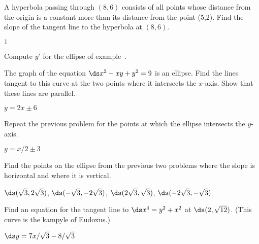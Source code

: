 \begin{exercises}
\begin{exercise}
A hyperbola passing through $(8,6)$ consists of all points whose distance
from the origin is a constant more than its distance from the point (5,2).
Find the slope of the tangent line to the hyperbola at $(8,6)$.
\begin{answer} $1$
\end{answer}\end{exercise}

\begin{exercise}
Compute $y'$ for the ellipse of example~.
\end{exercise}

\begin{exercise} The graph of the equation $\ds x^2 - xy + y^2 = 9$ is an ellipse.
Find the lines tangent to this curve at the two
 points where it intersects the $x$-axis. Show that these lines are
 parallel.
\begin{answer} $y=2x\pm6$
\end{answer}\end{exercise}

\begin{exercise} Repeat the previous problem for the points at which the
 ellipse intersects the $y$-axis.
\begin{answer} $y=x/2\pm3$
\end{answer}\end{exercise}

\begin{exercise} Find the points on the ellipse from the previous two problems
 where the slope is horizontal and where it is vertical.
\begin{answer} $\ds (\sqrt3,2\sqrt3)$, $\ds (-\sqrt3,-2\sqrt3)$, $\ds (2\sqrt3,\sqrt3)$,
$\ds (-2\sqrt3,-\sqrt3)$ 
\end{answer}\end{exercise}

\begin{exercise} Find an equation for the tangent line to 
$\ds x^4 = y^2 + x^2$ at $\ds (2, \sqrt{12})$. 
(This curve is the {\dfont kampyle of Eudoxus}.)
\begin{answer} $\ds y=7x/\sqrt3-8/\sqrt3$
\end{answer}\end{exercise}


\end{exercises}

